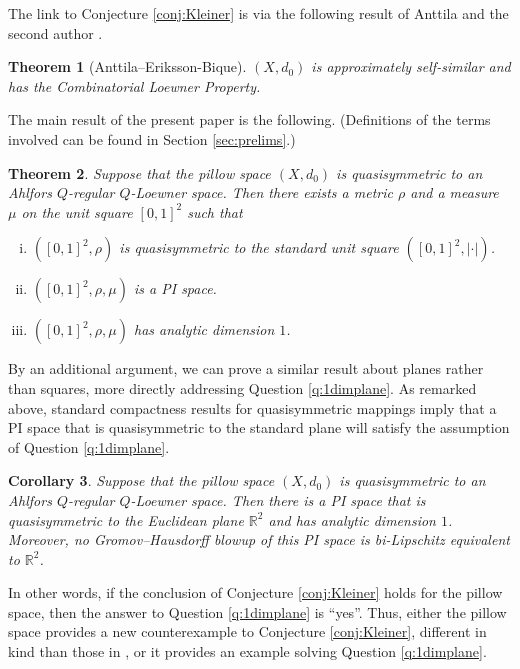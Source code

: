 \documentclass{amsart}
\theoremstyle{plain}
\newtheorem{theorem}{Theorem}
\newtheorem{corollary}[theorem]{Corollary}
\theoremstyle{definition}
\numberwithin{equation}{section}
\numberwithin{theorem}{section}
\newcommand{\RR}{\mathbb{R}}
\begin{document}
The link to Conjecture \ref{conj:Kleiner} is via the following result of Anttila and the second author \cite[Theorem 1.1, Proposition 1.7, Example 4.3]{AEBb}. 
\begin{theorem}[Anttila--Eriksson-Bique]\label{thm:AEB}
$(X,d_0)$ is approximately self-similar and has the Combinatorial Loewner Property.
\end{theorem}

The main result of the present paper is the following. (Definitions of the terms involved can be found in Section \ref{sec:prelims}.)

\begin{theorem}\label{thm:main}
Suppose that the pillow space $(X,d_0)$ is quasisymmetric to an Ahlfors $Q$-regular $Q$-Loewner space. Then there exists a metric $\rho$ and a measure $\mu$ on the unit square $[0,1]^2$ such that
\begin{enumerate}[(i)]
\item $([0,1]^2,\rho)$ is quasisymmetric to the standard unit square $([0,1]^2,|\cdot|)$.
\item $([0,1]^2,\rho,\mu)$ is a PI space.
\item $([0,1]^2,\rho,\mu)$ has analytic dimension $1$.
\end{enumerate}
\end{theorem}

By an additional argument, we can prove a similar result about planes rather than squares, more directly addressing Question \ref{q:1dimplane}. As remarked above, standard compactness results for quasisymmetric mappings imply that a PI space that is quasisymmetric to the standard plane will satisfy the assumption of Question \ref{q:1dimplane}.

\begin{corollary}\label{cor:1dimplane}
Suppose that the pillow space $(X,d_0)$ is quasisymmetric to an Ahlfors $Q$-regular $Q$-Loewner space. Then there is a PI space that is quasisymmetric to the Euclidean plane $\mathbb{R}^2$ and has analytic dimension $1$. Moreover, no Gromov--Hausdorff blowup of this PI space is bi-Lipschitz equivalent to $\RR^2$.
\end{corollary}

In other words, if the conclusion of Conjecture \ref{conj:Kleiner} holds for the pillow space, then the answer to Question \ref{q:1dimplane} is ``yes''. Thus, either the pillow space provides a new counterexample to Conjecture \ref{conj:Kleiner}, different in kind than those in \cite{AEBa}, or it provides an example solving Question \ref{q:1dimplane}. 
\end{document}
